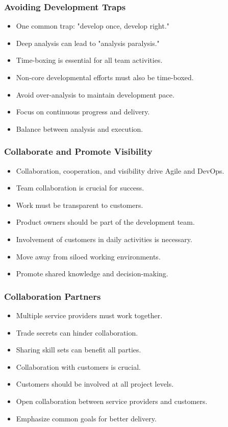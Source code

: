 \documentclass[aspectratio=169, table]{beamer}
\begin{document}
\begin{frame}
\frametitle{Avoiding Development Traps}

\begin{itemize}
	\item One common trap: "develop once, develop right."
	\item Deep analysis can lead to "analysis paralysis."
	\item Time-boxing is essential for all team activities.
	\item Non-core developmental efforts must also be time-boxed.
	\item Avoid over-analysis to maintain development pace.
	\item Focus on continuous progress and delivery.
	\item Balance between analysis and execution.
\end{itemize}
\end{frame}

\begin{frame}
\frametitle{Collaborate and Promote Visibility}

\begin{itemize}
	\item Collaboration, cooperation, and visibility drive Agile and DevOps.
	\item Team collaboration is crucial for success.
	\item Work must be transparent to customers.
	\item Product owners should be part of the development team.
	\item Involvement of customers in daily activities is necessary.
	\item Move away from siloed working environments.
	\item Promote shared knowledge and decision-making.
\end{itemize}
\end{frame}

\begin{frame}
\frametitle{Collaboration Partners}

\begin{itemize}
	\item Multiple service providers must work together.
	\item Trade secrets can hinder collaboration.
	\item Sharing skill sets can benefit all parties.
	\item Collaboration with customers is crucial.
	\item Customers should be involved at all project levels.
	\item Open collaboration between service providers and customers.
	\item Emphasize common goals for better delivery.
\end{itemize}
\end{frame}
\end{document}

